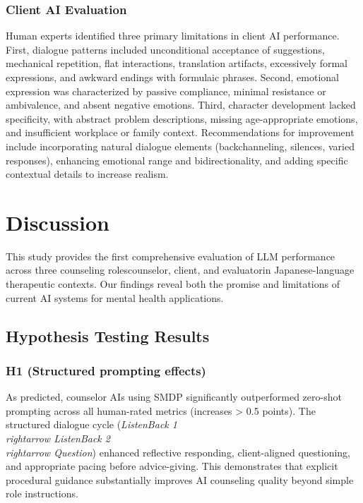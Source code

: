 \documentclass{wiley-article}
\begin{document}
\subsubsection*{Client AI Evaluation}

Human experts identified three primary limitations in client AI performance. First, dialogue patterns included unconditional acceptance of suggestions, mechanical repetition, flat interactions, translation artifacts, excessively formal expressions, and awkward endings with formulaic phrases. Second, emotional expression was characterized by passive compliance, minimal resistance or ambivalence, and absent negative emotions. Third, character development lacked specificity, with abstract problem descriptions, missing age-appropriate emotions, and insufficient workplace or family context. Recommendations for improvement include incorporating natural dialogue elements (backchanneling, silences, varied responses), enhancing emotional range and bidirectionality, and adding specific contextual details to increase realism.




\section*{Discussion}

This study provides the first comprehensive evaluation of LLM performance across three counseling roles\textemdash{}counselor, client, and evaluator\textemdash{}in Japanese-language therapeutic contexts. Our findings reveal both the promise and limitations of current AI systems for mental health applications.

\subsection*{Hypothesis Testing Results}

\subsubsection*{H1 (Structured prompting effects)}
As predicted, counselor AIs using SMDP significantly outperformed zero-shot prompting across all human-rated metrics (increases > 0.5 points). The structured dialogue cycle (\emph{Listen\textendash{}Back 1 \\rightarrow{} Listen\textendash{}Back 2 \\rightarrow{} Question}) enhanced reflective responding, client-aligned questioning, and appropriate pacing before advice-giving. This demonstrates that explicit procedural guidance substantially improves AI counseling quality beyond simple role instructions.
\end{document}
